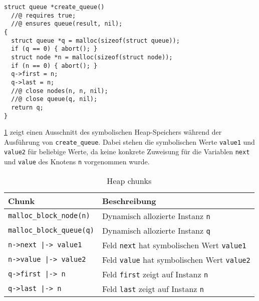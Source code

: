 \begin{lstlisting}[label=lst:create_queue]
struct queue *create_queue()
  //@ requires true;
  //@ ensures queue(result, nil);
{
  struct queue *q = malloc(sizeof(struct queue));
  if (q == 0) { abort(); }
  struct node *n = malloc(sizeof(struct node));
  if (n == 0) { abort(); }
  q->first = n;
  q->last = n;
  //@ close nodes(n, n, nil);
  //@ close queue(q, nil);
  return q;
}
\end{lstlisting}

\noindent
\cref{tab:heap-chunks} zeigt einen Ausschnitt des symbolischen Heap-Speichers während der Ausführung von \texttt{create\_queue}. Dabei stehen die symbolischen Werte \texttt{value1} und \texttt{value2} für beliebige Werte, da keine konkrete Zuweisung für die Variablen \texttt{next} und \texttt{value} des Knotens \texttt{n} vorgenommen wurde.

{\setlength\extrarowheight{5pt} %
\begin{table}[hbt!]
	\centering
	\begin{tabular}{|l|l|}
		\hline
		\rowcolor{LightGrey1}
		\textbf{Chunk}                   & \textbf{Beschreibung}                                     \\ \hline
		\texttt{malloc\_block\_node(n)}  & Dynamisch allozierte Instanz \texttt{n}                   \\ \hline
		\texttt{malloc\_block\_queue(q)} & Dynamisch allozierte Instanz \texttt{q}                   \\ \hline
		\texttt{n->next |-> value1}      & Feld \texttt{next} hat symbolischen Wert \texttt{value1}  \\ \hline
		\texttt{n->value |-> value2}     & Feld \texttt{value} hat symbolischen Wert \texttt{value2} \\ \hline
		\texttt{q->first |-> n}          & Feld \texttt{first} zeigt auf Instanz \texttt{n}          \\ \hline
		\texttt{q->last |-> n}           & Feld \texttt{last} zeigt auf Instanz \texttt{n}           \\ \hline
	\end{tabular}
	\caption{Heap chunks}
	\label{tab:heap-chunks}
\end{table}
}

